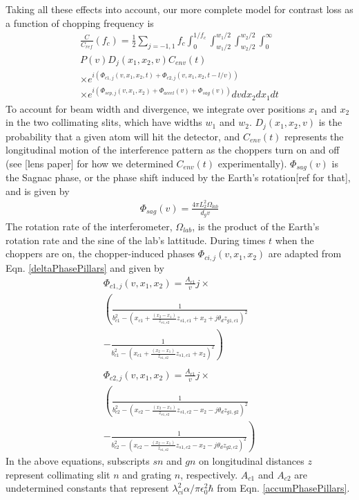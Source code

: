 \documentclass[twocolumn, prl,showpacs,superscriptaddress]{revtex4-1}   %
\newcommand{\eqnref}[1]{Eqn. \ref{#1}}
\begin{document}
Taking all these effects into account, our more complete model for contrast loss as a function of chopping frequency is
\begin{align}
	\frac{C}{C_{ref}}(f_c) = 
		\frac{1}{2} \sum_{j=-1,1}
		f_c \int_0^{1/f_c} 
		\int_{w_1/2}^{w_1/2}
		\int_{w_2/2}^{w_2/2}
		\int_0^{\infty}           
		\nonumber \\
		P(v)
		D_j(x_1, x_2, v)
		C_{env}(t)                   
		\nonumber \\ \times
		e^{i( \Phi_{c1,j}(v,x_1,x_2,t) + \Phi_{c2,j}(v,x_1,x_2,t-l/v) )}
		\nonumber \\ \times
		e^{i( \Phi_{sep,j}(v,x_1,x_2) + \Phi_{accel}(v) + \Phi_{sag}(v) )}
		dv dx_{2} dx_{1} dt	
	\label{CvCF}
\end{align}
To account for beam width and divergence, we integrate over positions $x_1$ and $x_2$ in the two collimating slits, which have widths $w_1$ and $w_2$. $D_j(x_1, x_2, v)$ is the probability that a given atom will hit the detector, and $C_{env}(t)$ represents the longitudinal motion of the interference pattern as the choppers turn on and off (see [lens paper] for how we determined $C_{env}(t)$ experimentally). $\Phi_{sag}(v)$ is the Sagnac phase, or the phase shift induced by the Earth's rotation[ref for that], and is given by
\begin{align}
	\Phi_{sag}(v) = \frac{4\pi L_2^2\Omega_{lab}}{d_g v}
	\label{phiSag}
\end{align}
The rotation rate of the interferometer, $\Omega_{lab}$, is the product of the Earth's rotation rate and the sine of the lab's lattitude.
During times $t$ when the choppers are on, the chopper-induced phases $\Phi_{ci,j}(v,x_1,x_2)$ are adapted from \eqnref{deltaPhasePillars} and given by
\begin{align}
	\Phi_{c1,j}(v,x_1,x_2) = \frac{A_{c1}}{v}j \times \nonumber \\
	\left(
		\frac{1}{b_{c1}^2 -
			(x_{c1} + \frac{(x_2-x_1)}{z_{s1,s2}}z_{s1,c1} + x_2 + j\theta_d z_{g1,c1})^2
		}
		\right. \nonumber \\ - \left.
		\frac{1}{b_{c1}^2 -
			(x_{c1} + \frac{(x_2-x_1)}{z_{s1,s2}}z_{s1,c1} + x_2)^2
		}
	\right)
	\nonumber \\ 
	\nonumber \\	
	\Phi_{c2,j}(v,x_1,x_2) = \frac{A_{c1}}{v}j \times \nonumber \\
	\left(
		\frac{1}{b_{c2}^2 -
			(x_{c2} - \frac{(x_2-x_1)}{z_{s1,s2}}z_{s1,c2} - x_2 - j\theta_d z_{g1,g2})^2
		}
		\right. \nonumber \\ - \left.
		\frac{1}{b_{c2}^2 -
			(x_{c2} - \frac{(x_2-x_1)}{z_{s1,s2}}z_{s1,c2} - x_2 - j\theta_d z_{g2,c2})^2
		}
	\right)
	\label{phic1c2}
\end{align}
In the above equations, subscripts $sn$ and $gn$ on longitudinal distances $z$ represent collimating slit $n$ and grating $n$, respectively. $A_{c1}$ and $A_{c2}$ are undetermined constants that represent $\lambda_{ci}^2 \alpha / \pi \epsilon_0^2 \hbar$ from \eqnref{accumPhasePillars}. 
\end{document}
